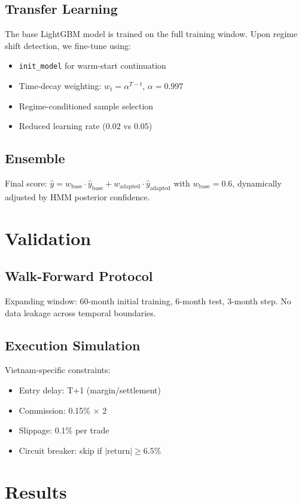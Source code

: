 \documentclass[12pt,a4paper]{article}
\begin{document}
\subsection{Transfer Learning}
The base LightGBM model is trained on the full training window. Upon regime
shift detection, we fine-tune using:
\begin{itemize}
    \item \texttt{init\_model} for warm-start continuation
    \item Time-decay weighting: $w_t = \alpha^{T-t}$, $\alpha = 0.997$
    \item Regime-conditioned sample selection
    \item Reduced learning rate ($0.02$ vs $0.05$)
\end{itemize}

\subsection{Ensemble}
Final score: $\hat{y} = w_{\text{base}} \cdot \hat{y}_{\text{base}} + w_{\text{adapted}} \cdot \hat{y}_{\text{adapted}}$
with $w_{\text{base}} = 0.6$, dynamically adjusted by HMM posterior confidence.

\section{Validation}
\label{sec:validation}

\subsection{Walk-Forward Protocol}
Expanding window: 60-month initial training, 6-month test, 3-month step.
No data leakage across temporal boundaries.

\subsection{Execution Simulation}
Vietnam-specific constraints:
\begin{itemize}
    \item Entry delay: T+1 (margin/settlement)
    \item Commission: 0.15\% $\times$ 2
    \item Slippage: 0.1\% per trade
    \item Circuit breaker: skip if $|\text{return}| \geq 6.5\%$
\end{itemize}

\section{Results}
\label{sec:results}
\end{document}
